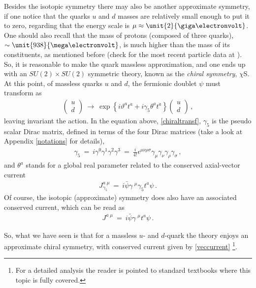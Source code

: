 Besides the isotopic symmetry there may also be another approximate symmetry, if one notice that
the quarks $u$ and $d$ masses are relatively small enough to put it to zero, regarding that the
energy scale is $\mu \approx \unit{2}{\giga\electronvolt}$. One should also recall that the mass
of protons (composed of three quarks), $\sim \unit{938}{\mega\electronvolt}$, is much higher
than the mass of its constituents, as mentioned before (check for the most recent particle data
at \cite{Agashe:2014kda}). So, it is reasonable to make the quark massless approximation, and
one ends up with an $SU(2)\times SU(2)$ symmetric theory, known as the \emph{chiral symmetry},
$\chi$S. At this point, of massless quarks $u$ and $d$, the fermionic doublet $\psi$ must
transform as 
\begin{eqnarray}
\left(
\begin{array}{ll}
u \\
d
\end{array}
\right)
~\to~ 
\exp\left\{ i\vartheta^{a} t^{a} + i\gamma_{5}\theta^{a} t^{a} \right\} 
\left(
\begin{array}{ll}
u \\
d
\end{array}
\right)\,,
\end{eqnarray}
leaving invariant the action. In the equation above, \eqref{chiraltransf}, $\gamma_{5}$ is the
pseudo scalar Dirac matrix, defined in terms of the four Dirac matrices (take a look at Appendix
\ref{notations} for details),
\begin{eqnarray}
\gamma_{5} ~=~ i\gamma^{0}\gamma^{1}\gamma^{2}\gamma^{3} ~=~
\frac{i}{4!}\epsilon^{\mu\nu\rho\sigma}\gamma_{\mu}\gamma_{\nu}\gamma_{\rho}\gamma_{\sigma}\,,
\end{eqnarray}
and $\theta^{a}$ stands for a global real parameter related to the conserved axial-vector
current
\begin{eqnarray}
J_{\gamma_{5}}^{a\;\mu} ~=~ i \bar{\psi} \gamma^{\,\,\mu}\gamma_{5}t^{a}\psi\,.
\label{veccurrent}
\end{eqnarray}
Of course, the isotopic (approximate) symmetry does also have an associated conserved current,
which can be read as
\begin{eqnarray}
J^{a\; \mu} ~=~ i\bar{\psi}\gamma^{\,\,\mu}t^{a}\psi\,.
\end{eqnarray}

So, what we have seen is that for a massless $u$- and $d$-quark the theory enjoys an approximate
chiral symmetry, with conserved current given by \eqref{veccurrent} \footnote{For a detailed
analysis the reader is pointed to standard textbooks
\cite{Weinberg:1996kr,Peskin:1995ev,Ryder:1985wq} where this topic is fully covered.}. 



